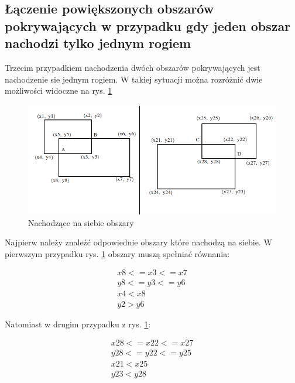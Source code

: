 \newpage
\subsection{Łączenie powiększonych obszarów pokrywających w przypadku gdy jeden obszar nachodzi tylko jednym rogiem }

Trzecim przypadkiem nachodzenia dwóch obszarów pokrywających jest nachodzenie sie jednym rogiem. W takiej sytuacji można rozróżnić dwie możliwości widoczne na rys. \ref{fig:mergedKrawedzie} 

\begin{figure}[h]
\caption{Nachodzące na siebie obszary}
\label{fig:mergedKrawedzie}
\centering
\includegraphics[width=1\textwidth]{mergedKrawedzie}
\end{figure}

Najpierw należy znaleźć odpowiednie obszary które nachodzą na siebie. W pierwszym przypadku rys. \ref{fig:mergedKrawedzie} obszary muszą spełniać równania:

\begin{equation}
\begin{split}
x8 <= x3 <= x7 \\
y8 <= y3 <= y6 \\
x4 < x8 \\
y2 > y6
\end{split}
\end{equation}

Natomiast w drugim przypadku z rys. \ref{fig:mergedKrawedzie}:

\begin{equation}
\begin{split}
x28 <= x22 <= x27 \\
y28 <= y22 <= y25 \\
x21 < x25 \\
y23 < y28
\end{split}
\end{equation}

